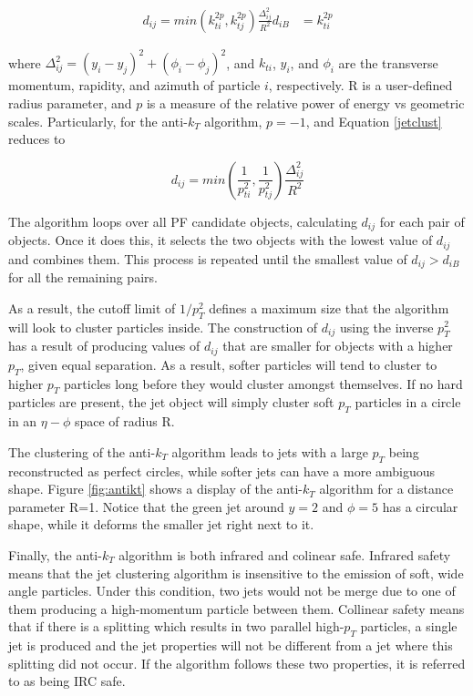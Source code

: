  \begin{align}
 \label{jetclust}
 d_{ij} = min(k_{ti}^{2p},k_{tj}^{2p})\frac{\Delta_{ij}^{2}}{R^{2}}
 d_{iB} &= k_{ti}^{2p}
 \end{align}

where $\Delta_{ij}^{2} = (y_{i}-y_{j})^{2}+(\phi_{i}-\phi_{j})^{2}$, and $k_{ti}$, $y_{i}$, and $\phi_{i}$ are the transverse momentum, rapidity, and azimuth of particle $i$, respectively. R is a user-defined radius parameter, and $p$ is a measure of the relative power of energy vs geometric scales. Particularly, for the anti-$k_{T}$ algorithm, $p=-1$, and Equation \ref{jetclust} reduces to

\begin{equation}
d_{ij} = min(\frac{1}{p_{ti}^{2}},\frac{1}{p_{tj}^{2}})\frac{\Delta_{ij}^{2}}{R^{2}}
\end{equation}

The algorithm loops over all PF candidate objects, calculating $d_{ij}$ for each pair of objects. Once it does this, it selects the two objects with the lowest value of $d_{ij}$ and combines them. This process is repeated until the smallest value of $d_{ij}>d_{iB}$ for all the remaining pairs. 

As a result, the cutoff limit of $1/p_{T}^{2}$ defines a maximum size that the algorithm will look to cluster particles inside. The construction of $d_{ij}$ using the inverse $p_{T}^{2}$ has a result of producing values of $d_{ij}$ that are smaller for objects with a higher $p_{T}$, given equal separation. As a result, softer particles will tend to cluster to higher $p_{T}$ particles long before they would cluster amongst themselves. If no hard particles are present, the jet object will simply cluster soft $p_{T}$ particles in a circle in an $\eta-\phi$ space of radius R.

The clustering of the anti-$k_{T}$ algorithm leads to jets with a large $p_{T}$ being reconstructed as perfect circles, while softer jets can have a more ambiguous shape. Figure \ref{fig:antikt} shows a display of the anti-$k_{T}$ algorithm for a distance parameter R=1. Notice that the green jet around $y=2$ and $\phi=5$ has a circular shape, while it deforms the smaller jet right next to it.

Finally, the anti-$k_{T}$ algorithm is both infrared and colinear safe. Infrared safety means that the jet clustering algorithm is insensitive to the emission of soft, wide angle particles. Under this condition, two jets would not be merge due to one of them producing a high-momentum particle between them. Collinear safety means that if there is a splitting which results in two parallel high-$p_{T}$ particles, a single jet is produced and the jet properties will not be different from a jet where this splitting did not occur. If the algorithm follows these two properties, it is referred to as being IRC safe.

